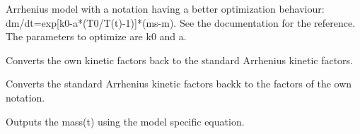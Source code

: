 \documentclass[letterpaper,10pt,english]{sphinxmanual}
\begin{document}

\begin{fulllineitems}
\label{FittingClasses:Fit_one_run.ArrheniusModelAlternativeNotation1}
Arrhenius model with a notation having a better optimization behaviour: dm/dt=exp{[}k0-a*(T0/T(t)-1){]}*(ms-m). See the documentation for the reference. The parameters to optimize are k0 and a.

\begin{fulllineitems}
\label{FittingClasses:Fit_one_run.ArrheniusModelAlternativeNotation1.ConvertKinFactors}
Converts the own kinetic factors back to the standard Arrhenius kinetic factors.

\end{fulllineitems}


\begin{fulllineitems}
\label{FittingClasses:Fit_one_run.ArrheniusModelAlternativeNotation1.ConvertKinFactorsToOwnNotation}
Converts the standard Arrhenius kinetic factors backk to the factors of the own notation.

\end{fulllineitems}


\begin{fulllineitems}
\label{FittingClasses:Fit_one_run.ArrheniusModelAlternativeNotation1.calcMass}
Outputs the mass(t) using the model specific equation.

\end{fulllineitems}


\end{fulllineitems}

\end{document}
